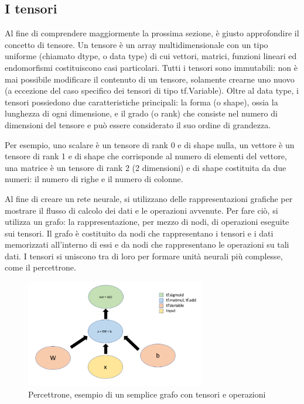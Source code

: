 \subsection{I tensori}
Al fine di comprendere maggiormente la prossima sezione, è giusto approfondire il concetto di tensore. Un tensore è un array multidimensionale con un tipo uniforme (chiamato dtype, o data type) di cui vettori, matrici, funzioni
lineari ed endomorfismi costituiscono casi particolari. Tutti i tensori sono immutabili: non è mai possibile modificare il contenuto di un tensore, solamente crearne uno nuovo (a eccezione del caso specifico dei tensori di tipo tf.Variable).
Oltre al data type, i tensori possiedono due caratteristiche principali: la forma (o shape), ossia la lunghezza di ogni dimensione, e il grado (o rank) che consiste nel numero di dimensioni del tensore e può essere considerato
il suo ordine di grandezza.

Per esempio, uno scalare è un tensore di rank 0 e di shape nulla, un vettore è un tensore di rank 1 e di shape che corrisponde al numero di elementi del vettore, una matrice è un tensore di rank 2 (2 dimensioni) e di shape costituita
da due numeri: il numero di righe e il numero di colonne.

Al fine di creare un rete neurale, si utilizzano delle rappresentazioni grafiche per mostrare il flusso di calcolo dei dati e le operazioni avvenute. Per fare ciò, si utilizza un grafo: la rappresentazione, per mezzo di nodi,
di operazioni eseguite sui tensori. Il grafo è costituito da nodi che rappresentano i tensori e i dati memorizzati all’interno di essi e da nodi che rappresentano le operazioni su tali dati. I tensori si uniscono tra di loro
per formare unità neurali più complesse, come il percettrone.

\begin{figure}[ht]
    \centering
    \includegraphics[width=0.7\textwidth]{Immagini/tensore.png}
    \caption{Percettrone, esempio di un semplice grafo con tensori e operazioni}
    \label{fig:tensore}
\end{figure}

